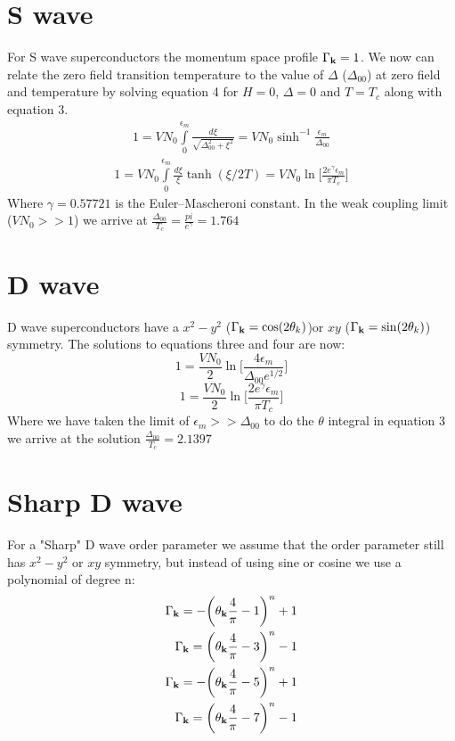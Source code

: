 \documentclass{article}
\begin{document}
\section*{S wave}
For S wave superconductors the momentum space profile $\Gamma_{\bf k}=1$. We now can relate the zero field transition temperature to the value of $\Delta$ ($\Delta_{00}$) at zero field and temperature by solving equation 4 for $H=0$, $\Delta=0$ and $T=T_c$ along with equation 3.
\begin{align}
1=V N_0 \int \limits_0^{\epsilon_m}\frac{d\xi}{\sqrt{\Delta_{00}^2+\xi^2}}=VN_0 \sinh^{-1}\frac{\epsilon_m}{\Delta_{00}}
\end{align}
\begin{align}
1=V N_0\int\limits_0^{\epsilon_m} \frac{d\xi}{\xi}\tanh(\xi/2T)=VN_0 \ln\bigg[ \frac{2e^{\gamma}\epsilon_m}{\pi T_c}\bigg]
\end{align}
Where $\gamma=0.57721$ is the Euler–Mascheroni constant. In the weak coupling limit ($VN_0>>1$) we arrive at $\frac{\Delta_{00}}{T_c}=\frac{pi}{e^{\gamma}}=1.764$

\section*{D wave}
D wave superconductors have a $x^2-y^2$ ($\Gamma_{\bf k}=\cos(2\theta_k)$)or $xy$ ($\Gamma_{\bf k}=\sin(2\theta_k)$) symmetry. The solutions to equations three and four are now:
\begin{equation}
1=\frac{VN_0}{2}\ln\bigg[\frac{4\epsilon_m}{\Delta_{00}e^{1/2}}\bigg]
\end{equation}
\begin{equation}
1=\frac{VN_0}{2} \ln\bigg[ \frac{2e^\gamma \epsilon_m}{\pi T_c}\bigg]
\end{equation}
Where we have taken the  limit of $\epsilon_m>>\Delta_{00}$ to do the $\theta$ integral in equation 3 we arrive at the solution $\frac{\Delta_{00}}{T_c}=2.1397$

\section*{Sharp D wave}
For a "Sharp" D wave order parameter we assume that the order parameter still has $x^2-y^2$ or $xy$ symmetry, but instead of using sine or cosine we use a polynomial of degree n:
\begin{align}
\Gamma_{\bf k}=-\bigg(\theta_{\bf k}\frac{4}{\pi}-1\bigg)^n+1 \\
\Gamma_{\bf k}=\bigg(\theta_{\bf k}\frac{4}{\pi}-3\bigg)^n-1 \\
\Gamma_{\bf k}=-\bigg(\theta_{\bf k}\frac{4}{\pi}-5\bigg)^n+1 \\
\Gamma_{\bf k}=\bigg(\theta_{\bf k}\frac{4}{\pi}-7\bigg)^n-1 
\end{align}
\end{document}

